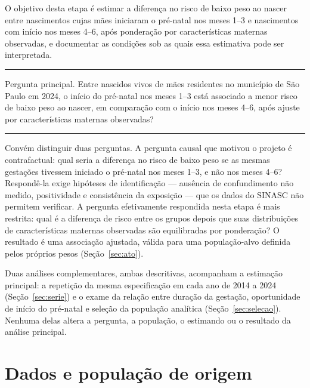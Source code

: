 \documentclass[11pt,a4paper]{article}
\begin{document}
O objetivo desta etapa é estimar a diferença no risco de baixo peso ao nascer entre
nascimentos cujas mães iniciaram o pré-natal nos meses 1--3 e nascimentos com início nos
meses 4--6, após ponderação por características maternas observadas, e documentar as
condições sob as quais essa estimativa pode ser interpretada.

\begin{center}
\begin{minipage}{0.9\linewidth}
{\color{iptciano}\rule{\linewidth}{0.6pt}}\par\vspace{2pt}
\textsf{\color{iptazul}Pergunta principal.} Entre nascidos vivos de mães residentes no
município de São Paulo em 2024, o início do pré-natal nos meses 1--3 está associado a
menor risco de baixo peso ao nascer, em comparação com o início nos meses 4--6, após
ajuste por características maternas observadas?\par\vspace{2pt}
{\color{iptciano}\rule{\linewidth}{0.6pt}}
\end{minipage}
\end{center}

Convém distinguir duas perguntas. A pergunta causal que motivou o projeto é
contrafactual: qual seria a diferença no risco de baixo peso se as mesmas gestações
tivessem iniciado o pré-natal nos meses 1--3, e não nos meses 4--6? Respondê-la exige
hipóteses de identificação --- ausência de confundimento não medido, positividade e
consistência da exposição \cite{hernan2025} --- que os dados do SINASC não permitem
verificar. A pergunta efetivamente respondida nesta etapa é mais restrita: qual é a
diferença de risco entre os grupos depois que suas distribuições de características
maternas observadas são equilibradas por ponderação? O resultado é uma associação
ajustada, válida para uma população-alvo definida pelos próprios pesos
(Seção~\ref{sec:ato}).

Duas análises complementares, ambas descritivas, acompanham a estimação principal: a
repetição da mesma especificação em cada ano de 2014 a 2024 (Seção~\ref{sec:serie}) e o
exame da relação entre duração da gestação, oportunidade de início do pré-natal e seleção
da população analítica (Seção~\ref{sec:selecao}). Nenhuma delas altera a pergunta, a
população, o estimando ou o resultado da análise principal.

\section{Dados e população de origem}\label{sec:dados}
\end{document}
